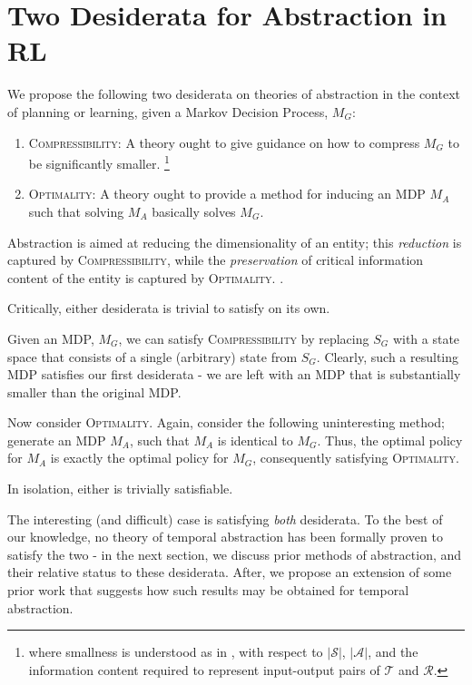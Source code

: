 \section{Two Desiderata for Abstraction in RL}

We propose the following two desiderata on theories of abstraction in the context of planning or learning, given a Markov Decision Process, $M_G$:
\begin{enumerate}
\item \textsc{Compressibility}: A theory ought to give guidance on how to compress $M_G$ to be significantly smaller. \footnote{where smallness is understood as in \cite{littman1995complexity}, with respect to $|\mathcal{S}|$, $|\mathcal{A}|$, and the information content required to represent input-output pairs of $\mathcal{T}$ and $\mathcal{R}$.}
\item \textsc{Optimality}: A theory ought to provide a method for inducing an MDP $M_A$ such that solving $M_A$ basically solves $M_G$.
\end{enumerate}

Abstraction is aimed at reducing the dimensionality of an entity; this {\it reduction} is captured by \textsc{Compressibility}, while the {\it preservation} of critical information content of the entity is captured by \textsc{Optimality}. .

Critically, either desiderata is trivial to satisfy on its own.

Given an \ac{MDP}, $M_G$, we can satisfy \textsc{Compressibility} by replacing $S_G$ with a state space that consists of a single (arbitrary) state from $S_G$. Clearly, such a resulting \ac{MDP} satisfies our first desiderata - we are left with an MDP that is substantially smaller than the original MDP. 

Now consider \textsc{Optimality}. Again, consider the following uninteresting method; generate an MDP $M_A$, such that $M_A$ is identical to $M_G$. Thus, the optimal policy for $M_A$ is exactly the optimal policy for $M_G$, consequently satisfying \textsc{Optimality}.

In isolation, either is trivially satisfiable.

The interesting (and difficult) case is satisfying {\it both} desiderata. To the best of our knowledge, no theory of temporal abstraction has been formally proven to satisfy the two - in the next section, we discuss prior methods of abstraction, and their relative status to these desiderata. After, we propose an extension of some prior work that suggests how such results may be obtained for temporal abstraction.